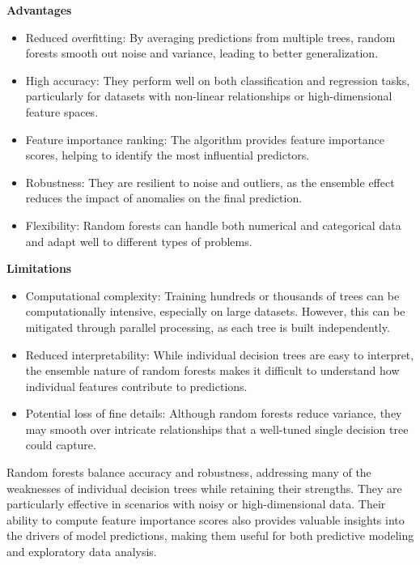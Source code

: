 \documentclass[
]{book}
\providecommand{\tightlist}{%
  \setlength{\itemsep}{0pt}\setlength{\parskip}{0pt}}
\theoremstyle{definition}
\theoremstyle{definition}
\theoremstyle{definition}
\theoremstyle{definition}
\theoremstyle{remark}
\begin{document}
\textbf{Advantages}

\begin{itemize}
\tightlist
\item
  Reduced overfitting: By averaging predictions from multiple trees, random forests smooth out noise and variance, leading to better generalization.\\
\item
  High accuracy: They perform well on both classification and regression tasks, particularly for datasets with non-linear relationships or high-dimensional feature spaces.\\
\item
  Feature importance ranking: The algorithm provides feature importance scores, helping to identify the most influential predictors.\\
\item
  Robustness: They are resilient to noise and outliers, as the ensemble effect reduces the impact of anomalies on the final prediction.\\
\item
  Flexibility: Random forests can handle both numerical and categorical data and adapt well to different types of problems.
\end{itemize}

\textbf{Limitations}

\begin{itemize}
\tightlist
\item
  Computational complexity: Training hundreds or thousands of trees can be computationally intensive, especially on large datasets. However, this can be mitigated through parallel processing, as each tree is built independently.\\
\item
  Reduced interpretability: While individual decision trees are easy to interpret, the ensemble nature of random forests makes it difficult to understand how individual features contribute to predictions.\\
\item
  Potential loss of fine details: Although random forests reduce variance, they may smooth over intricate relationships that a well-tuned single decision tree could capture.
\end{itemize}

Random forests balance accuracy and robustness, addressing many of the weaknesses of individual decision trees while retaining their strengths. They are particularly effective in scenarios with noisy or high-dimensional data. Their ability to compute feature importance scores also provides valuable insights into the drivers of model predictions, making them useful for both predictive modeling and exploratory data analysis.
\end{document}
